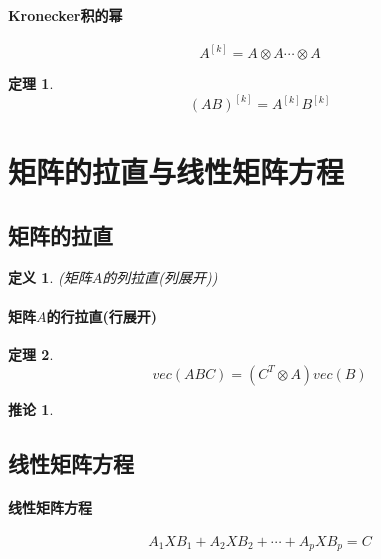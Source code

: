 \documentclass[twoside]{article}
\newtheorem{theorem}{定理}[section]
\newtheorem{corollary}{推论}[section]
\newtheorem{definition}{定义}[section]
\begin{document}
\paragraph{Kronecker积的幂}
\begin{equation}
  A^{[k]} = A \otimes A \cdots \otimes A
\end{equation}

\begin{theorem}
  \begin{equation}
    (AB)^{[k]} = A^{[k]} B^{[k]}
  \end{equation}
\end{theorem}

\section{矩阵的拉直与线性矩阵方程}
\subsection{矩阵的拉直}
\begin{definition}
  (矩阵$A$的列拉直(列展开))
\end{definition}

\paragraph{矩阵$A$的行拉直(行展开)}\label{par:label_name}


\begin{theorem}
  \begin{equation}
    vec(ABC) = (C^T \otimes A) vec(B)
  \end{equation}
\end{theorem}

\begin{corollary}
\end{corollary}

\subsection{线性矩阵方程}
\paragraph{线性矩阵方程}\label{par:label_name}
\begin{equation}
  A_1XB_1 + A_2XB_2 + \cdots + A_pXB_p=C
\end{equation}
\end{document}
